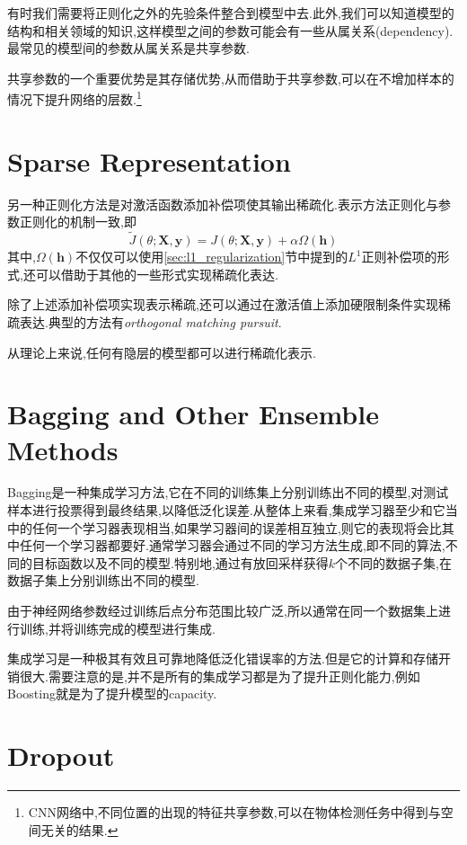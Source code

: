 有时我们需要将正则化之外的先验条件整合到模型中去.此外,我们可以知道模型的结构和相关领域的知识,这样模型之间的参数可能会有一些从属关系(dependency).最常见的模型间的参数从属关系是共享参数.

共享参数的一个重要优势是其存储优势,从而借助于共享参数,可以在不增加样本的情况下提升网络的层数.\footnote{CNN网络中,不同位置的出现的特征共享参数,可以在物体检测任务中得到与空间无关的结果.}

\section{Sparse Representation}

另一种正则化方法是对激活函数添加补偿项使其输出稀疏化.表示方法正则化与参数正则化的机制一致,即
\begin{equation}
\tilde J(\theta;\mathbf{X,y})=J(\theta;\mathbf{X,y})+\alpha\Omega(\mathbf h)
\end{equation}
其中,$\Omega(\mathbf h)$不仅仅可以使用\ref{sec:l1_regularization}节中提到的$L^1$正则补偿项的形式,还可以借助于其他的一些形式实现稀疏化表达.

除了上述添加补偿项实现表示稀疏,还可以通过在激活值上添加硬限制条件实现稀疏表达.典型的方法有\textit{orthogonal matching pursuit}.

从理论上来说,任何有隐层的模型都可以进行稀疏化表示.

\section{Bagging and Other Ensemble Methods}

Bagging是一种集成学习方法,它在不同的训练集上分别训练出不同的模型,对测试样本进行投票得到最终结果,以降低泛化误差.从整体上来看,集成学习器至少和它当中的任何一个学习器表现相当,如果学习器间的误差相互独立,则它的表现将会比其中任何一个学习器都要好.通常学习器会通过不同的学习方法生成,即不同的算法,不同的目标函数以及不同的模型.特别地,通过有放回采样获得$k$个不同的数据子集,在数据子集上分别训练出不同的模型.

由于神经网络参数经过训练后点分布范围比较广泛,所以通常在同一个数据集上进行训练,并将训练完成的模型进行集成.

集成学习是一种极其有效且可靠地降低泛化错误率的方法.但是它的计算和存储开销很大.需要注意的是,并不是所有的集成学习都是为了提升正则化能力,例如Boosting就是为了提升模型的capacity.

\section{Dropout}

